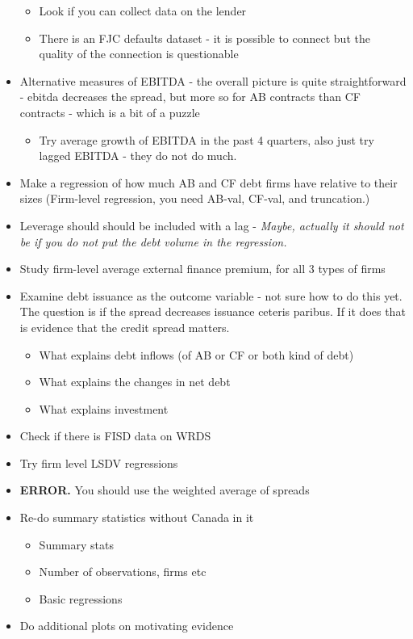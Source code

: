 \documentclass[12pt]{article}
\begin{document}
\begin{itemize}
\begin{itemize}
        \item Look if you can collect data on the lender 
        \item There is an FJC defaults dataset - it is possible to connect but the quality of the connection is questionable \checkmark
    \end{itemize}
    \item Alternative measures of EBITDA \checkmark - the overall picture is quite straightforward - ebitda decreases the spread, but more so for AB contracts than CF contracts - which is a bit of a puzzle 
    \begin{itemize}
        \item Try average growth of EBITDA in the past 4 quarters, also just try lagged EBITDA - they do not do much. \checkmark
    \end{itemize}
    \item Make a regression of how much AB and CF debt firms have relative to their sizes (Firm-level regression, you need AB-val, CF-val, and truncation.) \checkmark
    \item Leverage should should be included with a lag - \textit{Maybe, actually it should not be if you do not put the debt volume in the regression.} \checkmark
    \item Study firm-level average external finance premium, for all 3 types of firms \checkmark
    \item Examine debt issuance as the outcome variable - not sure how to do this yet. The question is if the spread decreases issuance ceteris paribus. If it does that is evidence that the credit spread matters. \checkmark
    \begin{itemize}
        \item What explains debt inflows (of AB or CF or both kind of debt) \checkmark
        \item What explains the changes in net debt \checkmark
        \item What explains investment \checkmark
    \end{itemize}
    \item Check if there is FISD data on WRDS \checkmark
    \item Try firm level LSDV regressions \checkmark
    \item \textbf{ERROR.} You should use the weighted average of spreads \checkmark
    \item Re-do summary statistics without Canada in it \checkmark
    \begin{itemize}
        \item Summary stats \checkmark
        \item Number of observations, firms etc \checkmark
        \item Basic regressions \checkmark
    \end{itemize}
    \item Do additional plots on motivating evidence \checkmark
\end{itemize} \normalsize
\end{document}
